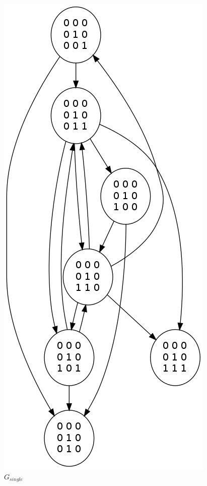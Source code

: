 \documentclass[12pt]{article}
\begin{document}
\pagestyle{fancy}

\maketitle
    \newpage

    \newpage
\tableofcontents
    \newpage

    \newpage

    \newpage

    \newpage

    \newpage


    \newpage
\appendix

\begin{figure}
  \includegraphics[scale=0.50]{body/images/graph_single_all.jpg}
  \caption{$G_{single}$}
  \label{fig:graph_single_all}
\end{figure}
\end{document}
